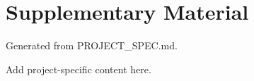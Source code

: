 \section{Supplementary Material}
Generated from PROJECT_SPEC.md.

Add project-specific content here.
